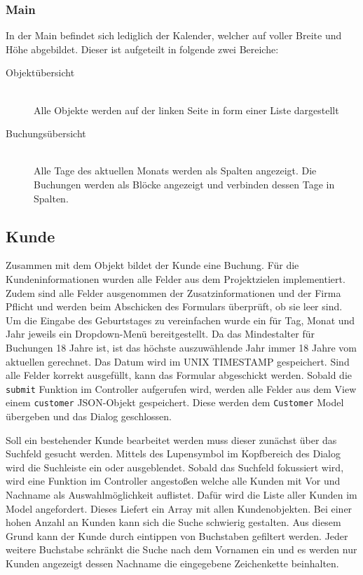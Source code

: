 \subsubsection{Main}
In der Main befindet sich lediglich der Kalender, welcher auf voller Breite und Höhe abgebildet. 
Dieser ist aufgeteilt in folgende zwei Bereiche:
\begin{description}
\item[Objektübersicht]\hfill \\
Alle Objekte werden auf der linken Seite in form einer Liste dargestellt
\item[Buchungsübersicht]\hfill \\ 
Alle Tage des aktuellen Monats werden als Spalten angezeigt. Die Buchungen werden als Blöcke angezeigt und verbinden dessen Tage in Spalten.  
\end{description}

\subsection{Kunde}
Zusammen mit dem Objekt bildet der Kunde eine Buchung. Für die Kundeninformationen wurden alle Felder aus dem Projektzielen implementiert. Zudem sind alle Felder ausgenommen der Zusatzinformationen und der Firma Pflicht und werden beim Abschicken des Formulars überprüft, ob sie leer sind. Um die Eingabe des Geburtstages zu vereinfachen wurde ein für Tag, Monat und Jahr jeweils ein Dropdown-Menü bereitgestellt. Da das Mindestalter für Buchungen 18 Jahre ist, ist das höchste auszuwählende Jahr immer 18 Jahre vom aktuellen gerechnet. Das Datum wird im UNIX TIMESTAMP gespeichert. Sind alle Felder korrekt ausgefüllt, kann das Formular abgeschickt werden. Sobald die \texttt{submit} Funktion im Controller aufgerufen wird, werden alle Felder aus dem View einem \texttt{customer} JSON-Objekt gespeichert. Diese werden dem \texttt{Customer} Model übergeben und das Dialog geschlossen. 

Soll ein bestehender Kunde bearbeitet werden muss dieser zunächst über das Suchfeld gesucht werden. Mittels des Lupensymbol im Kopfbereich des Dialog wird die Suchleiste ein oder ausgeblendet. Sobald das Suchfeld fokussiert wird, wird eine Funktion im Controller angestoßen welche alle Kunden mit Vor und Nachname als Auswahlmöglichkeit auflistet. Dafür wird die Liste aller Kunden im Model angefordert. Dieses Liefert ein Array mit allen Kundenobjekten. Bei einer hohen Anzahl an Kunden kann sich die Suche schwierig gestalten. Aus diesem Grund kann der Kunde durch eintippen von Buchstaben gefiltert werden. Jeder weitere Buchstabe schränkt die Suche nach dem Vornamen ein und es werden nur Kunden angezeigt dessen Nachname die eingegebene Zeichenkette beinhalten. 

